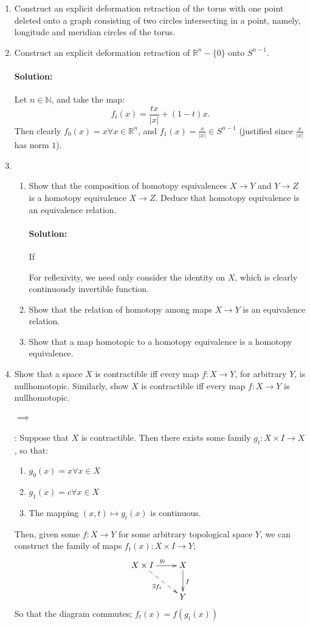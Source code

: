 \documentclass{article}
\begin{document}
\begin{enumerate} 
    \item Construct an explicit deformation retraction of the torus with one point deleted
onto a graph consisting of two circles intersecting in a point, namely, longitude and
meridian circles of the torus.
    \item Construct an explicit deformation retraction of $\mathbb{R}^{n}- \{0\}$ onto $S^{n-1}$.
        \paragraph{Solution: }Let $ n\in \mathbb{N} $, and take the map:
        \[
        f_t(x)=\frac{tx}{|x|}+(1-t)x
        .\] 
        Then clearly $ f_0(x)=x\forall x\in \mathbb{R}^{n} $, and $ f_1(x)=\frac{x}{|x|}\in S^{n-1} $ (justified since $ \frac{x}{|x|} $ has norm $ 1 $).

    \item \begin{enumerate}
        \item Show that the composition of homotopy equivalences $X\to Y $ and $Y\to  Z$ is a homotopy equivalence $X\to  Z$. Deduce that homotopy equivalence is an equivalence relation.
            \paragraph{Solution: }If 

            For reflexivity, we need only consider the identity on $ X $, which is clearly continuously invertible function.
        \item Show that the relation of homotopy among maps $X\to Y$ is an equivalence relation.
        \item Show that a map homotopic to a homotopy equivalence is a homotopy equivalence.
    \end{enumerate}

    \item Show that a space $X $ is contractible iff every map $f:X\to Y$, for arbitrary $Y$, is nullhomotopic. Similarly, show  $X$ is contractible iff every map $f:X\to Y$ is nullhomotopic.
        \paragraph{$ \implies $}: Suppose that $ X $ is contractible. Then there exists some family $ g_t:X\times I\to X $, so that:
        \begin{enumerate}
            \item $ g_0(x)=x\forall x\in X $
            \item $ g_1(x)=c\forall x\in X $
            \item The mapping $ (x,t)\mapsto g_t(x)  $ is continuous.
        \end{enumerate}
        Then, given some $ f:X\to Y $ for some arbitrary topological space $ Y $, we can construct the family of maps $ f_t(x):X\times I\to Y $;
        \[\xymatrix{
                X\times I\ar[r]^{g_t}\ar@{-->}[dr]_{\exists f_t}&X\ar[d]^{f} \\
                                                    &Y
        }\]
        So that the diagram commutes; $ f_t(x)=f(g_t(x)) $

\end{enumerate}
\end{document}

